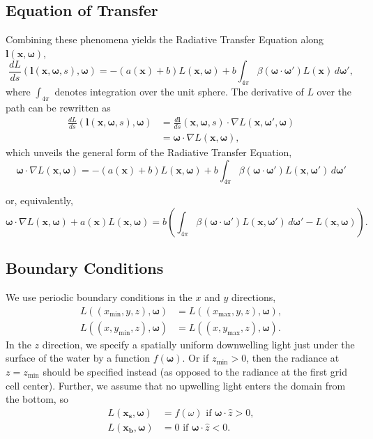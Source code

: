 \documentclass[ms,cpyr,lof,lot]{uathesis}
\newcommand\xmin{{x_{\min}}}
\newcommand\xmax{{x_{\max}}}
\newcommand\ymin{{y_{\min}}}
\newcommand\ymax{{y_{\max}}}
\newcommand\zmin{{z_{\min}}}
\renewcommand\vec\bm
\begin{document}
\subsection{Equation of Transfer}
Combining these phenomena yields the Radiative Transfer Equation along
$\vec{l}(\vec{x}, \vec{\omega})$,
\begin{equation}
  \label{eqn:rte1d}
  \frac{dL}{ds}(\vec{l}(\vec{x}, \vec{\omega}, s), \vec{\omega})
  = -(a(\vec{x}) + b)L(\vec{x}, \vec{\omega})
  + b \int_{4\pi} \beta(\vec{\omega}\cdot\vec{\omega}') L(\vec{x})\, d\vec{\omega}',
\end{equation}
where $\int_{4\pi}$ denotes integration over the unit sphere.
The derivative of $L$ over the path can be rewritten as
\begin{align*}
  \frac{dL}{ds}(\vec{l}(\vec{x}, \vec{\omega}, s), \vec{\omega})
    &= \frac{d\vec{l}}{ds}(\vec{x}, \vec{\omega}, s) \cdot \nabla L(\vec{x}, \vec{\omega}', \vec{\omega}) \\
    &= \vec{\omega} \cdot \nabla L(\vec{x}, \vec{\omega}),
\end{align*}
which unveils the general form of the Radiative Transfer Equation,
\begin{equation*}
  \vec{\omega} \cdot \nabla L(\vec{x}, \vec{\omega})
  = -(a(\vec{x}) + b)L(\vec{x}, \vec{\omega})
  + b \int_{4\pi} \beta(\vec{\omega}\cdot\vec{\omega}') L(\vec{x}, \vec{\omega}')\, d\vec{\omega}'
\end{equation*}

or, equivalently,
\begin{equation}
  \vec{\omega} \cdot \nabla L(\vec{x}, \vec{\omega})
  + a(\vec{x})L(\vec{x}, \vec{\omega})
  = b \left(
    \int_{4\pi} \beta(\vec{\omega}\cdot\vec{\omega}') L(\vec{x}, \vec{\omega}')\, d\vec{\omega}'
    - L(\vec{x}, \vec{\omega})
  \right).
  \label{eqn:rte}
\end{equation}

\subsection{Boundary Conditions}

We use periodic boundary conditions in the $x$ and $y$ directions,
\begin{align*}
  L\left((\xmin, y, z), \vec{\omega}\right) &= L\left((\xmax, y, z), \vec{\omega}\right), \\
  L\left((x, \ymin, z), \vec{\omega}\right) &= L\left((x, \ymax, z), \vec{\omega}\right).
\end{align*}
In the $z$ direction, we specify a spatially uniform downwelling light just
under the surface of the water by a function $f(\vec{\omega})$.
Or if $\zmin>0$, then the radiance at $z=\zmin$ should be specified instead (as opposed to the radiance at the first grid cell center).
Further, we assume that no upwelling light enters the domain from the bottom, so
\begin{align*}
  L(\vec{x_s}, \vec{\omega}) &= f(\omega) \mbox{ if } \vec{\omega} \cdot \hat{z} > 0, \\ 
  L(\vec{x_b}, \vec{\omega}) &= 0 \mbox { if } \vec{\omega} \cdot \hat{z} < 0.
\end{align*}
 
\end{document}
